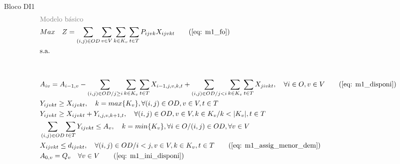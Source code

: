 
\begin{bloque1}{Bloco \hypertarget{frase:DI1}{DI1} }
\allowdisplaybreaks
\begin{align}
	 & \textcolor{gray}{\text{Modelo básico}} \notag   \\
	 & Max \quad Z = \sum_{(i,j)\in OD} \sum_{v\in V} \sum_{k\in K_v} \sum_{t\in T} P_{ijvk} X_{ijvkt}     \tag{\ref{eq: m1_fo}}                                                                                                  \\
	 & \text{s.a.}  \notag     \\ \notag \\ \notag                                                                                                                                                                                                    \\
	 & A_{iv} = A_{i-1,v} - \sum_{(i,j) \in OD/j \geq i} \sum_{k\in K_v}\sum_{t\in T}X_{i-1,j,v,k,t} + \sum_{(i,j) \in OD/j<i} \sum_{k\in K_v}\sum_{t\in T}X_{jivkt}, \quad \forall i \in O, v \in V   \tag{\ref{eq: m1_disponi}} \\
	 & Y_{ijvkt} \geq  X_{ijvkt},  \quad k = max\{K_v\}, \forall(i,j) \in OD ,v \in V, t \in T      \label{eq: rel_x_y_1}                                                                                                         \\
	 & Y_{ijvkt} \geq  X_{ijvkt} + Y_{i,j,v,k + 1,t} , \quad \forall(i,j) \in OD, v \in V, k \in K_v / k <  |K_v| , t \in T       \label{eq: rel_x_y_2}                                                                \\
	 & \sum_{(i,j) \in OD}\sum_{t\in T} Y_{ijvkt} \leq A_v, \quad  k = min\{K_v\}, \forall i \in O / (i,j) \in OD,   \forall v \in V     \label{eq: cap_min_y}                                                                \\
	 & X_{ijvkt} \leq d_{ijvkt},  \quad \forall (i,j) \in OD / i < j  ,v \in V, k \in K_v, t\in T   \tag{\ref{eq: m1_assig_menor_dem}}                                                                                            \\
	 & A_{0,v} = Q_v \quad \forall v \in V  \tag{\ref{eq: m1_ini_disponi}}                                                                                                                                                        \\

\end{align}
\end{bloque1}
